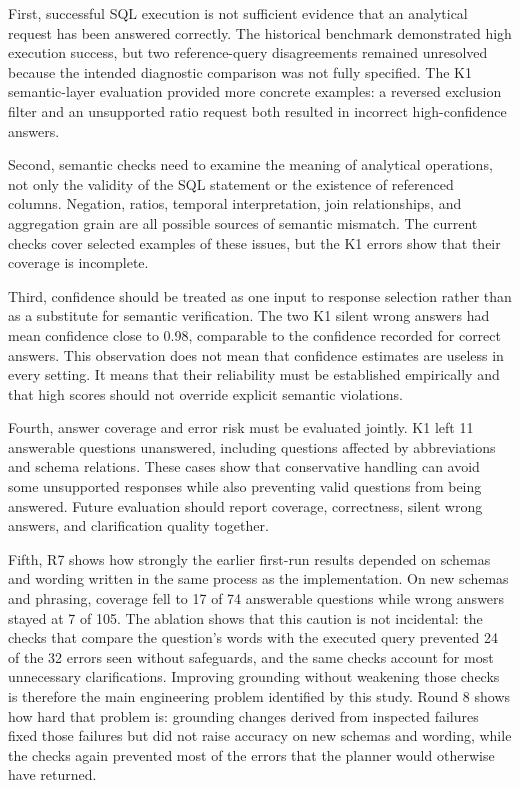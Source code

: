 \documentclass[conference]{IEEEtran}
\begin{document}
First, successful SQL execution is not sufficient evidence that an analytical request has been answered correctly. The historical benchmark demonstrated high execution success, but two reference-query disagreements remained unresolved because the intended diagnostic comparison was not fully specified. The K1 semantic-layer evaluation provided more concrete examples: a reversed exclusion filter and an unsupported ratio request both resulted in incorrect high-confidence answers.

Second, semantic checks need to examine the meaning of analytical operations, not only the validity of the SQL statement or the existence of referenced columns. Negation, ratios, temporal interpretation, join relationships, and aggregation grain are all possible sources of semantic mismatch. The current checks cover selected examples of these issues, but the K1 errors show that their coverage is incomplete.

Third, confidence should be treated as one input to response selection rather than as a substitute for semantic verification. The two K1 silent wrong answers had mean confidence close to 0.98, comparable to the confidence recorded for correct answers. This observation does not mean that confidence estimates are useless in every setting. It means that their reliability must be established empirically and that high scores should not override explicit semantic violations.

Fourth, answer coverage and error risk must be evaluated jointly. K1 left 11 answerable questions unanswered, including questions affected by abbreviations and schema relations. These cases show that conservative handling can avoid some unsupported responses while also preventing valid questions from being answered. Future evaluation should report coverage, correctness, silent wrong answers, and clarification quality together.

Fifth, R7 shows how strongly the earlier first-run results depended on schemas and wording written in the same process as the implementation. On new schemas and phrasing, coverage fell to 17 of 74 answerable questions while wrong answers stayed at 7 of 105. The ablation shows that this caution is not incidental: the checks that compare the question's words with the executed query prevented 24 of the 32 errors seen without safeguards, and the same checks account for most unnecessary clarifications. Improving grounding without weakening those checks is therefore the main engineering problem identified by this study. Round 8 shows how hard that problem is: grounding changes derived from inspected failures fixed those failures but did not raise accuracy on new schemas and wording, while the checks again prevented most of the errors that the planner would otherwise have returned.
\end{document}
